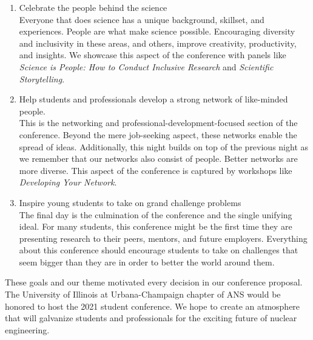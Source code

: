 \begin{enumerate}
	\item Celebrate the people behind the science\\
	Everyone that does science has a unique background, skillset, and experiences. People are what make science possible. Encouraging diversity and inclusivity in these areas, and others, improve creativity, productivity, and insights. We showcase this aspect of the conference with panels like \textit{Science is People: How to Conduct Inclusive Research} and \textit{Scientific Storytelling}.
	\item Help students and professionals develop a strong network of like-minded people.\\
	This is the networking and professional-development-focused section of the conference. Beyond the mere job-seeking aspect, these networks enable the spread of ideas. Additionally, this night builds on top of the previous night as we remember that our networks also consist of people. Better networks are more diverse. This aspect of the conference is captured by workshops like \textit{Developing Your Network}. 
	\item Inspire young students to take on grand challenge problems\\
	The final day is the culmination of the conference and the single unifying ideal. For many students, this conference might be the first time they are presenting research to their peers, mentors, and future employers. Everything about this conference should encourage students to take on challenges that seem bigger than they are in order to better the world around them. 
\end{enumerate}
These goals and our theme motivated every decision in our conference proposal. The University of Illinois at Urbana-Champaign chapter of ANS would be honored to host the 2021 student conference. We hope to create an atmosphere that will galvanize students and professionals for the exciting future of nuclear engineering.\\
